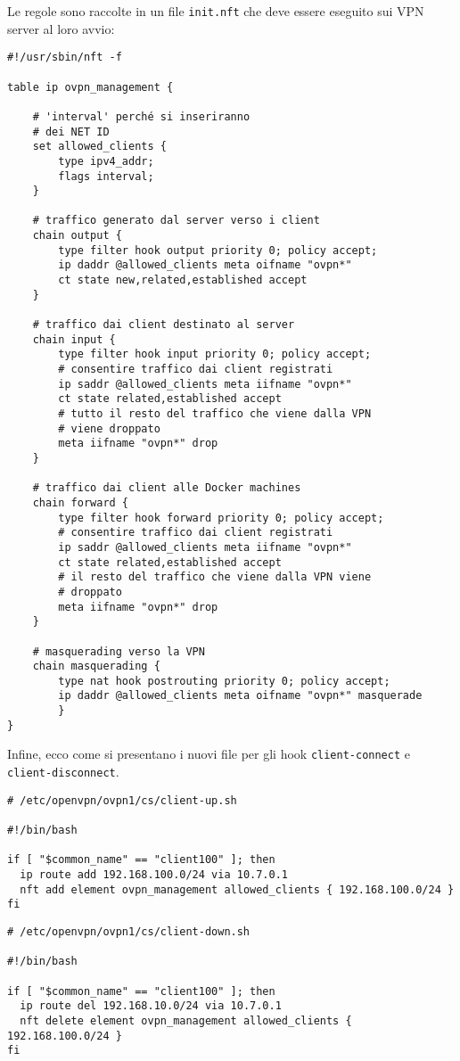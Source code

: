 		Le regole sono raccolte in un file \texttt{init.nft} che deve essere
		eseguito sui VPN server al loro avvio:
		\begin{verbatim}
#!/usr/sbin/nft -f
			
table ip ovpn_management {
					
	# 'interval' perché si inseriranno
	# dei NET ID
	set allowed_clients {
		type ipv4_addr;
		flags interval;
	}
					
	# traffico generato dal server verso i client
	chain output {
		type filter hook output priority 0; policy accept;
		ip daddr @allowed_clients meta oifname "ovpn*"
		ct state new,related,established accept
	}
					
	# traffico dai client destinato al server
	chain input {
		type filter hook input priority 0; policy accept;
		# consentire traffico dai client registrati
		ip saddr @allowed_clients meta iifname "ovpn*"
		ct state related,established accept
		# tutto il resto del traffico che viene dalla VPN
		# viene droppato
		meta iifname "ovpn*" drop
	}
					
	# traffico dai client alle Docker machines
	chain forward {
		type filter hook forward priority 0; policy accept;
		# consentire traffico dai client registrati
		ip saddr @allowed_clients meta iifname "ovpn*"
		ct state related,established accept
		# il resto del traffico che viene dalla VPN viene
		# droppato
		meta iifname "ovpn*" drop
	}
					
	# masquerading verso la VPN
	chain masquerading {
		type nat hook postrouting priority 0; policy accept;
		ip daddr @allowed_clients meta oifname "ovpn*" masquerade
		}
}
		\end{verbatim}
		
		Infine, ecco come si presentano i nuovi file per gli hook \texttt{client-connect}
		e \texttt{client-disconnect}.
		
		\begin{verbatim}
# /etc/openvpn/ovpn1/cs/client-up.sh
			
#!/bin/bash
			
if [ "$common_name" == "client100" ]; then
  ip route add 192.168.100.0/24 via 10.7.0.1
  nft add element ovpn_management allowed_clients { 192.168.100.0/24 }
fi	
		\end{verbatim}
		
		\begin{verbatim}
# /etc/openvpn/ovpn1/cs/client-down.sh
				
#!/bin/bash
				
if [ "$common_name" == "client100" ]; then
  ip route del 192.168.10.0/24 via 10.7.0.1
  nft delete element ovpn_management allowed_clients { 192.168.100.0/24 }
fi	
		\end{verbatim}
		
				
				
				
